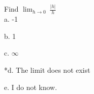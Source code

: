 
Find $\displaystyle \lim_{h \rightarrow 0}\ \frac{|h|}{h}$\\

a. -1

b. 1

c. $\infty$

*d. The limit does not exist

e. I do not know.\\
